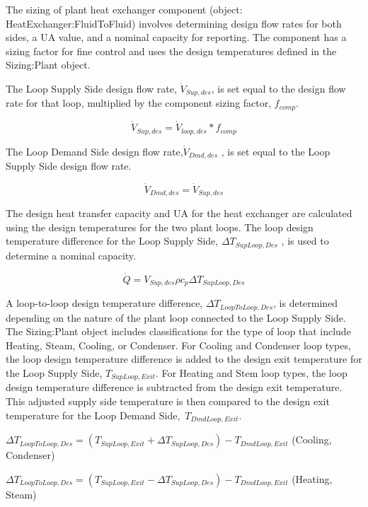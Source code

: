 The sizing of plant heat exchanger component (object: HeatExchanger:FluidToFluid) involves determining design flow rates for both sides, a UA value, and a nominal capacity for reporting. The component has a sizing factor for fine control and uses the design temperatures defined in the Sizing:Plant object.

The Loop Supply Side design flow rate, \({\dot V_{Sup,des}}\), is set equal to the design flow rate for that loop, multiplied by the component sizing factor, \({f_{comp}}\).

\begin{equation}
{\dot V_{Sup,des}} = {\dot V_{loop,des}}*{f_{comp}}
\end{equation}

The Loop Demand Side design flow rate,\({\dot V_{Dmd,des}}\) , is set equal to the Loop Supply Side design flow rate.

\begin{equation}
{\dot V_{Dmd,des}} = {\dot V_{Sup,des}}
\end{equation}

The design heat transfer capacity and UA for the heat exchanger are calculated using the design temperatures for the two plant loops. The loop design temperature difference for the Loop Supply Side, \(\Delta {T_{SupLoop,Des}}\) , is used to determine a nominal capacity.

\begin{equation}
\dot Q = V_{Sup,des} \rho {c_p} \Delta {T_{SupLoop,Des}}
\end{equation}

A loop-to-loop design temperature difference, \(\Delta {T_{LoopToLoop,Des}}\), is determined depending on the nature of the plant loop connected to the Loop Supply Side. The Sizing:Plant object includes classifications for the type of loop that include Heating, Steam, Cooling, or Condenser. For Cooling and Condenser loop types, the loop design temperature difference is added to the design exit temperature for the Loop Supply Side, \({T_{SupLoop,Exit}}\). For Heating and Stem loop types, the loop design temperature difference is subtracted from the design exit temperature. This adjusted supply side temperature is then compared to the design exit temperature for the Loop Demand Side,~\({T_{DmdLoop,Exit}}\).

\(\Delta {T_{LoopToLoop,Des}} = \left( {{T_{SupLoop,Exit}} + \Delta {T_{SupLoop,Des}}} \right) - {T_{DmdLoop,Exit}}\) (Cooling, Condenser)

\(\Delta {T_{LoopToLoop,Des}} = \left( {{T_{SupLoop,Exit}} - \Delta {T_{SupLoop,Des}}} \right) - {T_{DmdLoop,Exit}}\) (Heating, Steam)

